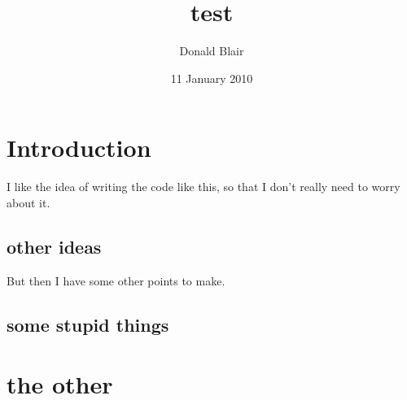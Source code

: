 \documentclass[11pt]{article}
\title{test}
\date{11 January 2010}
\begin{document}
\maketitle


\author{Donald Blair}

\section{Introduction}
\label{sec-1}

I like the idea of writing the code like this, so that I don't really need to worry about it.
\subsection{other ideas}
\label{sec-1.1}

But then I have some other points to make.
\subsection{some stupid things}
\label{sec-1.2}


\section{the other}
\label{sec-2}
\end{document}
